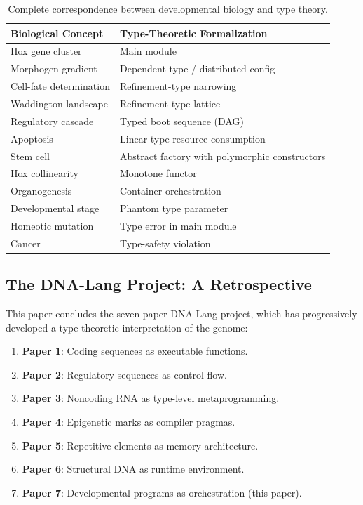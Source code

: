 \documentclass[12pt,a4paper]{article}
\begin{document}
\begin{table}[H]
\centering
\begin{tabular}{ll}
\toprule
\textbf{Biological Concept} & \textbf{Type-Theoretic Formalization} \\
\midrule
Hox gene cluster & Main module \\
Morphogen gradient & Dependent type / distributed config \\
Cell-fate determination & Refinement-type narrowing \\
Waddington landscape & Refinement-type lattice \\
Regulatory cascade & Typed boot sequence (DAG) \\
Apoptosis & Linear-type resource consumption \\
Stem cell & Abstract factory with polymorphic constructors \\
Hox collinearity & Monotone functor \\
Organogenesis & Container orchestration \\
Developmental stage & Phantom type parameter \\
Homeotic mutation & Type error in main module \\
Cancer & Type-safety violation \\
\bottomrule
\end{tabular}
\caption{Complete correspondence between developmental biology and type theory.}
\label{tab:correspondence}
\end{table}

\subsection{The DNA-Lang Project: A Retrospective}

This paper concludes the seven-paper DNA-Lang project, which has
progressively developed a type-theoretic interpretation of the
genome:

\begin{enumerate}
  \item \textbf{Paper 1}: Coding sequences as executable functions.
  \item \textbf{Paper 2}: Regulatory sequences as control flow.
  \item \textbf{Paper 3}: Noncoding RNA as type-level metaprogramming.
  \item \textbf{Paper 4}: Epigenetic marks as compiler pragmas.
  \item \textbf{Paper 5}: Repetitive elements as memory architecture.
  \item \textbf{Paper 6}: Structural DNA as runtime environment.
  \item \textbf{Paper 7}: Developmental programs as orchestration
    (this paper).
\end{enumerate}
\end{document}
